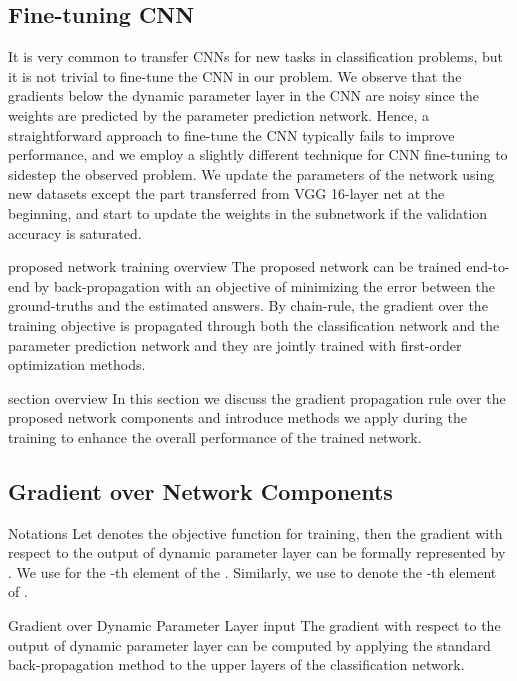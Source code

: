 \documentclass[10pt,twocolumn,letterpaper]{article}
\begin{document}
\subsection{Fine-tuning CNN}



It is very common to transfer CNNs for new tasks in classification problems, but it is not trivial to fine-tune the CNN in our problem.
We observe that the gradients below the dynamic parameter layer in the CNN are noisy since the weights are predicted by the parameter prediction network.
Hence, a straightforward approach to fine-tune the CNN typically fails to improve performance, and we employ a slightly different technique for CNN fine-tuning to sidestep the observed problem. 
We update the parameters of the network using new datasets except the part transferred from VGG 16-layer net at the beginning, and start to update the weights in the subnetwork if the validation accuracy is saturated.




\iffalse
{\color{blue} proposed network training overview}
The proposed network can be trained end-to-end by back-propagation with an objective of minimizing the error between the ground-truths and the estimated answers.
By chain-rule, the gradient over the training objective is propagated through both the classification network and the parameter prediction network and they are {\color{cyan}jointly} trained with first-order optimization methods.

{\color{blue} section overview}
{\color{cyan}In this} section {\color{cyan}we discuss} the gradient propagation rule over the proposed network components and introduce methods we apply during the training to enhance the overall performance of the trained network.

\subsection{Gradient over Network Components}
{\color{blue} Notations}
Let  denotes the objective function for training, then the gradient {\color{cyan}with respect to} the output of dynamic parameter layer can be formally represented by .
We use  for the -th element of the .
Similarly, we use  to denote the -th element of .

{\color{blue} Gradient over Dynamic Parameter Layer input}
The gradient {\color{cyan}with respect to} the output of dynamic parameter layer  can be computed by {\color{blue}applying the} standard back-propagation {\color{cyan}method to the upper layers of the classification network}. 
\end{document}
